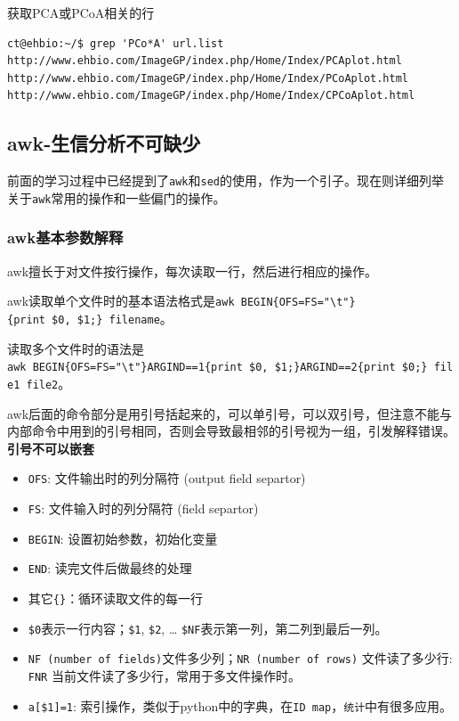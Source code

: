 \documentclass[]{article}
\numberwithin{figure}{section}
\numberwithin{table}{section}
\begin{document}
获取PCA或PCoA相关的行

\begin{verbatim}
ct@ehbio:~/$ grep 'PCo*A' url.list 
http://www.ehbio.com/ImageGP/index.php/Home/Index/PCAplot.html
http://www.ehbio.com/ImageGP/index.php/Home/Index/PCoAplot.html
http://www.ehbio.com/ImageGP/index.php/Home/Index/CPCoAplot.html
\end{verbatim}

\hypertarget{awk}{%
\subsection{awk-生信分析不可缺少}\label{awk}}

前面的学习过程中已经提到了\texttt{awk}和\texttt{sed}的使用，作为一个引子。现在则详细列举关于\texttt{awk}常用的操作和一些偏门的操作。

\hypertarget{awk_explain}{%
\subsubsection{awk基本参数解释}\label{awk_explain}}

awk擅长于对文件按行操作，每次读取一行，然后进行相应的操作。

awk读取单个文件时的基本语法格式是\texttt{awk\ \textquotesingle{}BEGIN\{OFS=FS="\textbackslash{}t"\}\{print\ \$0,\ \$1;\}\textquotesingle{}\ filename}。

读取多个文件时的语法是\texttt{awk\ \textquotesingle{}BEGIN\{OFS=FS="\textbackslash{}t"\}ARGIND==1\{print\ \$0,\ \$1;\}ARGIND==2\{print\ \$0;\}\textquotesingle{}\ file1\ file2}。

awk后面的命令部分是用引号括起来的，可以单引号，可以双引号，但注意不能与内部命令中用到的引号相同，否则会导致最相邻的引号视为一组，引发解释错误。\textbf{引号不可以嵌套}

\begin{itemize}
\item
  \texttt{OFS}: 文件输出时的列分隔符 (output field separtor)
\item
  \texttt{FS}: 文件输入时的列分隔符 (field separtor)
\item
  \texttt{BEGIN}: 设置初始参数，初始化变量
\item
  \texttt{END}: 读完文件后做最终的处理
\item
  其它\texttt{\{\}}：循环读取文件的每一行
\item
  \texttt{\$0}表示一行内容；\texttt{\$1}, \texttt{\$2}, \ldots{} \texttt{\$NF}表示第一列，第二列到最后一列。
\item
  \texttt{NF\ (number\ of\ fields)}文件多少列；\texttt{NR\ (number\ of\ rows)} 文件读了多少行: \texttt{FNR} 当前文件读了多少行，常用于多文件操作时。
\item
  \texttt{a{[}\$1{]}=1}: 索引操作，类似于python中的字典，在\texttt{ID\ map}，\texttt{统计}中有很多应用。
\end{itemize}
\end{document}

